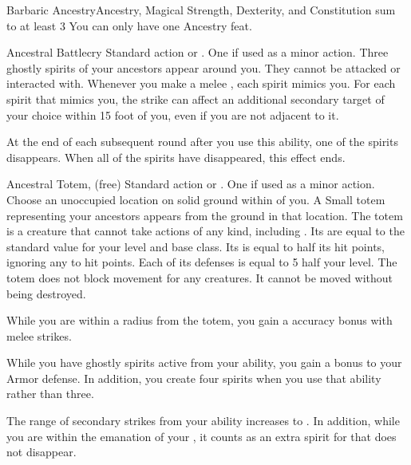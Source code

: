   \begin{magicalfeat}{Barbaric Ancestry}{Ancestry, Magical}
    \featpre Strength, Dexterity, and Constitution sum to at least 3
     You can only have one Ancestry feat.

    \begin{magicalactiveability}{Ancestral Battlecry}
      \abilityusagetime Standard action or .
      \abilitycost One  if used as a minor action.
      \rankline
      Three ghostly spirits of your ancestors appear around you.
      They cannot be attacked or interacted with.
      Whenever you make a melee , each spirit mimics you.
      For each spirit that mimics you, the strike can affect an additional secondary target of your choice within 15 foot  of you, even if you are not adjacent to it.

      At the end of each subsequent round after you use this ability, one of the spirits disappears.
      When all of the spirits have disappeared, this effect ends.
    \end{magicalactiveability}

    \begin{magicalsustainability}{Ancestral Totem}{,  (free)}
      \abilityusagetime Standard action or .
      \abilitycost One  if used as a minor action.
      \rankline
      Choose an unoccupied location on solid ground within \longrange of you.
      A Small totem representing your ancestors appears from the ground in that location.
      The totem is a creature that cannot take actions of any kind, including .
      Its  are equal to the standard value for your level and base class.
      Its  is equal to half its hit points, ignoring any  to hit points.
      Each of its defenses is equal to 5 \add half your level.
      The totem does not block movement for any creatures.
      It cannot be moved without being destroyed.

      While you are within a \largearea radius  from the totem, you gain a  accuracy bonus with melee strikes.
    \end{magicalsustainability}

     While you have ghostly spirits active from your  ability, you gain a  bonus to your Armor defense.
    In addition, you create four spirits when you use that ability rather than three.

     The range of secondary strikes from your  ability increases to \shortrange.
    In addition, while you are within the emanation of your , it counts as an extra spirit for  that does not disappear.
  \end{magicalfeat}

